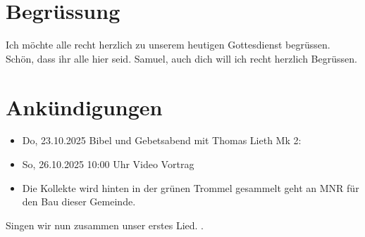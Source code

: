 \documentclass{../../inc/mybib}
\begin{document}
\section{Begrüssung}
Ich möchte alle recht herzlich zu unserem heutigen Gottesdienst begrüssen. Schön, dass ihr alle hier seid. Samuel, auch dich will ich recht herzlich Begrüssen. 

\beten{}

\section{Ankündigungen}
\begin{itemize}
    \item {} Do,  23.10.2025 Bibel und Gebetsabend mit Thomas Lieth Mk 2:
    \item {} So, 26.10.2025 10:00 Uhr Video Vortrag    
    \item Die Kollekte wird hinten in der grünen Trommel gesammelt geht an MNR für den Bau dieser Gemeinde.    
\end{itemize}

Singen wir nun zusammen unser erstes Lied.
{}.
\end{document}
